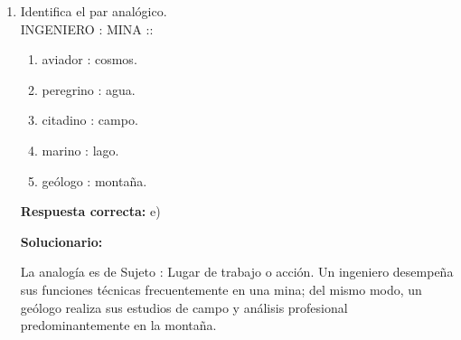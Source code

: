\begin{enumerate}[resume]
\begin{enumerate}[label=\alph*)]
	\item poco - y - al
	\item no - y tampoco - para
	\item algo - y - como para
	\item mucho - por el contrario - con el fin de
	\item nada - mientras - para
\end{enumerate}

\textbf{Respuesta correcta:} e)

\vspace{2mm}
\textbf{Solucionario:}

La oración expresa una oposición temporal y de sentido entre dos acciones relacionadas con la bomba atómica.
En la primera parte, se indica que no se ha hecho nada para salvar al mundo de la guerra; mientras que en la segunda parte se señala que sí se ha actuado con un propósito, es decir, para aumentar su capacidad destructiva.

El conector ``mientras'' introduce un contraste simultáneo, mostrando que, al mismo tiempo que no se realizan acciones para la paz, se desarrollan acciones orientadas a la destrucción.
La preposición ``para'' expresa finalidad, indicando el objetivo de aumentar el poder destructivo.

Por ello, la alternativa que mantiene coherencia lógica y semántica es:

\vspace{6mm}

\item Identifica el par analógico.\\
INGENIERO : MINA ::

\begin{enumerate}[label=\alph*)]
	\item aviador : cosmos.
	\item peregrino : agua.
	\item citadino : campo.
	\item marino : lago.
	\item geólogo : montaña.
\end{enumerate}

\textbf{Respuesta correcta:} e)

\vspace{2mm}
\textbf{Solucionario:}

La analogía es de Sujeto : Lugar de trabajo o acción. Un ingeniero desempeña sus funciones técnicas frecuentemente en una mina; del mismo modo, un geólogo realiza sus estudios de campo y análisis profesional predominantemente en la montaña.




\end{enumerate}
